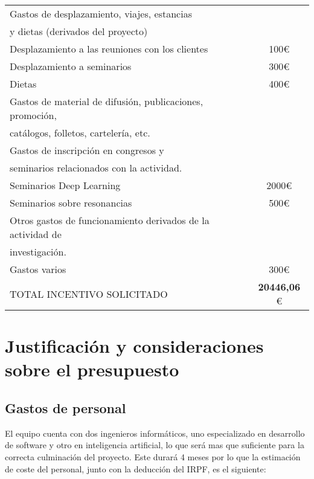 \documentclass[a4paper,12pt,oneside]{article}
\begin{document}
\begin{table}[H]
\begin{tabular}{|l|c|}
		\cellcolor[gray]{0.8}Gastos de desplazamiento, viajes, estancias    \\ 
		\cellcolor[gray]{0.8}y dietas (derivados del proyecto) &  \\ \hline
		Desplazamiento a las reuniones con los clientes & 100\euro \\ \hline
		Desplazamiento a seminarios & 300\euro \\ \hline
		Dietas &  400\euro \\ \hline
		\cellcolor[gray]{0.8}Gastos de material de difusión, publicaciones, promoción,   \\ 
		\cellcolor[gray]{0.8}catálogos, folletos, cartelería, etc. &  \\ \hline
		\cellcolor[gray]{0.8}Gastos de inscripción en congresos y \\
		\cellcolor[gray]{0.8}seminarios relacionados con la actividad. &  \\ \hline
		Seminarios Deep Learning &  2000\euro \\ \hline
		Seminarios sobre resonancias & 500\euro  \\ \hline
		\cellcolor[gray]{0.8}Otros gastos de funcionamiento derivados de la actividad de \\
		i\cellcolor[gray]{0.8}nvestigación. &  \\ \hline
		Gastos varios & 300\euro \\ \hline
		\cellcolor{red}TOTAL INCENTIVO SOLICITADO & \textbf{20446,06} \euro \\ \bottomrule
		\end{tabular}
	\caption{}
	\label{nombre_etiqueta}
\end{table}

\section*{Justificación y consideraciones sobre el presupuesto}

\subsection*{Gastos de personal}

El equipo cuenta con dos ingenieros informáticos, uno especializado en desarrollo de software y otro en inteligencia artificial, lo que será mas que suficiente para la correcta culminación del proyecto. Este durará 4 meses por lo que la estimación de coste del personal, junto con la deducción del IRPF, es el siguiente: \\
\end{document}
